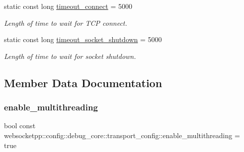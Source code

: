 \begin{DoxyCompactItemize}
\mbox{\label{structwebsocketpp_1_1config_1_1debug__core_1_1transport__config_a467d99957d7b4d5c098f3b916bd97b25}} 
static const long \mbox{\hyperlink{structwebsocketpp_1_1config_1_1debug__core_1_1transport__config_a467d99957d7b4d5c098f3b916bd97b25}{timeout\+\_\+connect}} = 5000
\begin{DoxyCompactList}\small\item\em Length of time to wait for T\+CP connect. \end{DoxyCompactList}\item 
\mbox{\label{structwebsocketpp_1_1config_1_1debug__core_1_1transport__config_a8d8f7daa43c1fd23d227f3f20e71ceb5}} 
static const long \mbox{\hyperlink{structwebsocketpp_1_1config_1_1debug__core_1_1transport__config_a8d8f7daa43c1fd23d227f3f20e71ceb5}{timeout\+\_\+socket\+\_\+shutdown}} = 5000
\begin{DoxyCompactList}\small\item\em Length of time to wait for socket shutdown. \end{DoxyCompactList}\end{DoxyCompactItemize}


\subsection{Member Data Documentation}
\mbox{\label{structwebsocketpp_1_1config_1_1debug__core_1_1transport__config_a082f02f956f0e82ff8646967a7c79e4a}} 
\subsubsection{\texorpdfstring{enable\+\_\+multithreading}{enable\_multithreading}}
{\footnotesize\ttfamily bool const websocketpp\+::config\+::debug\+\_\+core\+::transport\+\_\+config\+::enable\+\_\+multithreading = true\hspace{0.3cm}{\ttfamily [static]}}

